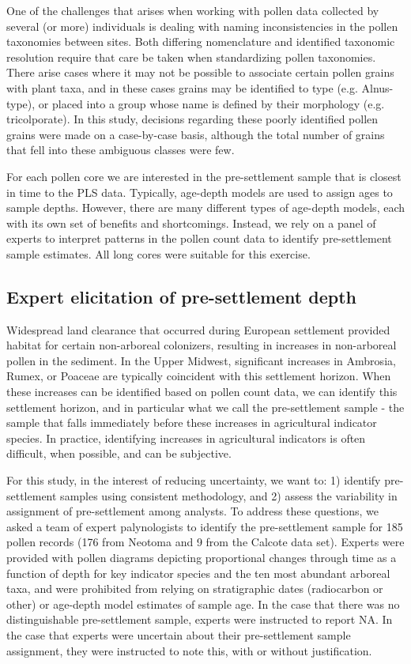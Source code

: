 \documentclass[12pt]{article}
\begin{document}
One of the challenges that arises when working with pollen data
collected by several (or more) individuals is dealing with naming
inconsistencies in the pollen taxonomies between sites. Both differing
nomenclature and identified taxonomic resolution require that care be
taken when standardizing pollen taxonomies. There arise cases where it
may not be possible to associate certain pollen grains with plant
taxa, and in these cases grains may be identified to type
(e.g. Alnus-type), or placed into a group whose name is defined by
their morphology (e.g. tricolporate). In this study, decisions
regarding these poorly identified pollen grains were made on a
case-by-case basis, although the total number of grains that fell into
these ambiguous classes were few.

For each pollen core we are interested in the pre-settlement sample
that is closest in time to the PLS data. Typically, age-depth models
are used to assign ages to sample depths. However, there are many
different types of age-depth models, each with its own set of benefits
and shortcomings. Instead, we rely on a panel of experts to interpret
patterns in the pollen count data to identify pre-settlement sample
estimates. All long cores were suitable for this exercise.

\subsection{Expert elicitation of pre-settlement depth}
Widespread land clearance that occurred during European settlement
provided habitat for certain non-arboreal colonizers, resulting in
increases in non-arboreal pollen in the sediment. In the Upper
Midwest, significant increases in Ambrosia, Rumex, or Poaceae are
typically coincident with this settlement horizon. When these
increases can be identified based on pollen count data, we can
identify this settlement horizon, and in particular what we call the
pre-settlement sample - the sample that falls immediately before these
increases in agricultural indicator species. In practice, identifying
increases in agricultural indicators is often difficult, when
possible, and can be subjective. 

For this study, in the interest of reducing uncertainty, we want to:
1) identify pre-settlement samples using consistent methodology, and
2) assess the variability in assignment of pre-settlement among
analysts. To address these questions, we asked a team of expert
palynologists to identify the pre-settlement sample for 185 pollen
records (176 from Neotoma and 9 from the Calcote data set). Experts
were provided with pollen diagrams depicting proportional changes
through time as a function of depth for key indicator species and the
ten most abundant arboreal taxa, and were prohibited from relying on
stratigraphic dates (radiocarbon or other) or age-depth model
estimates of sample age. In the case that there was no distinguishable
pre-settlement sample, experts were instructed to report NA. In the
case that experts were uncertain about their pre-settlement sample
assignment, they were instructed to note this, with or without
justification. 
\end{document}
